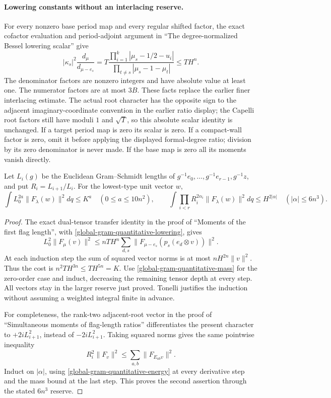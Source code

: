 \paragraph{Lowering constants without an interlacing reserve.}
For every nonzero base period map and every regular shifted
factor, the exact cofactor evaluation and period-adjoint argument
in ``The degree-normalized Bessel lowering scalar'' give
\cite{current-construction-record}
\begin{equation}\label{global-gram-quantitative-lowering}
 |\kappa_s|^2\frac{d_\mu}{d_{\mu-e_s}}
 =T\frac{\prod_{i=1}^k|\mu_s-1/2-u_i|}
          {\prod_{t\ne s}|\mu_s-1-\mu_t|}
 \le T H^n.
\end{equation}
The denominator factors are nonzero integers and have absolute
value at least one.  The numerator factors are at most $3B$.
These facts replace the earlier finer interlacing estimate.
The actual root character has the opposite sign to the adjacent
imaginary-coordinate convention in the earlier ratio display;
the Capelli root factors still have moduli $1$ and $\sqrt T$,
so this absolute scalar identity is unchanged.  If a target
period map is zero its scalar is zero.  If a compact-wall factor
is zero, omit it before applying the displayed formal-degree
ratio; division by its zero denominator is never made.
If the base map is zero all its moments vanish directly.

\begin{lemma}
\label{global-gram-quantitative-flag-moments}
Let $L_i(g)$ be the Euclidean Gram--Schmidt lengths of
$g^{-1}e_0,\ldots,g^{-1}e_{r-1},g^{-1}z$, and put
$R_i=L_{i+1}/L_i$.  For the lowest-type unit vector $w$,
\[
 \int L_0^{2a}\|F_\lambda(w)\|^2dq\le K^a
       \quad(0\le a\le10n^2),
 \qquad
 \int\prod_{i<r}R_i^{2\alpha_i}\|F_\lambda(w)\|^2dq
       \le H^{2|\alpha|}\quad(|\alpha|\le6n^3).
\]
\end{lemma}
\begin{proof}
The exact dual-tensor transfer identity in the proof of
``Moments of the first flag length'',\cite{current-construction-record} with
\eqref{global-gram-quantitative-lowering}, gives
\[
 L_0^2\|F_\mu(v)\|^2
 \le nT H^n\sum_{d,s}
           \|F_{\mu-e_s}(p_s(e_d\otimes v))\|^2.
\]
At each induction step the sum of squared vector norms is at most
$nH^{2n}\|v\|^2$.  Thus the cost is
$n^2TH^{3n}\le TH^{5n}=K$.
Use \eqref{global-gram-quantitative-mass} for the zero-order
case and induct, decreasing the remaining tensor depth at every
step.  All vectors stay in the larger reserve just proved.
Tonelli justifies the induction without assuming a weighted
integral finite in advance.

For completeness, the rank-two adjacent-root vector in the proof
of ``Simultaneous moments of flag-length ratios''
\cite{current-construction-record} differentiates the present
character to $+2iL_{i+1}^2$, instead of $-2iL_{i+1}^2$.
Taking squared norms gives the same pointwise inequality
\[
 R_i^2\|F_v\|^2\le\sum_{a,b}\|F_{E_{ab}v}\|^2.
\]
Induct on $|\alpha|$, using
\eqref{global-gram-quantitative-energy} at every derivative
step and the mass bound at the last step.  This proves the
second assertion through the stated $6n^3$ reserve.
\end{proof}


